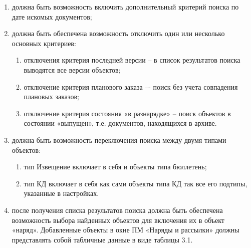 \documentclass[oneside, final, 12pt]{article}
\begin{document}
\begin{enumerate}
\begin{enumerate}
\begin{enumerate}
\begin{itemize}
            \end{itemize}
            \item должна быть возможность включить дополнительный критерий поиска по дате искомых документов;
            \item должна быть обеспечена возможность отключить один или несколько основных критериев:
            \begin{enumerate}
                \item отключения критерия последней версии -- в список результатов поиска выводятся все версии объектов;
                \item отключение критерия планового заказа –- поиск без учета совпадения плановых заказов;
                \item отключение критерия состояния «в разнарядке» -- поиск объектов в состоянии «выпущен», т.е. документов, находящихся в архиве.
            \end{enumerate}
            \item должна быть возможность переключения поиска между двумя типами объектов:
            \begin{enumerate}
                \item тип Извещение включает в себя и объекты типа бюллетень;
                \item тип КД включает в себя как сами объекты типа КД так все его подтипы, указанные в настройках.
            \end{enumerate}
            \item после получения списка результатов поиска должна быть обеспечена возможность выбора найденных объектов для включения их в объект «наряд». Добавленные объекты в окне ПМ «Наряды и рассылки» должны представлять собой табличные данные в виде таблицы 3.1.
            

\end{enumerate}
\end{enumerate}
\end{enumerate}
\end{document}
